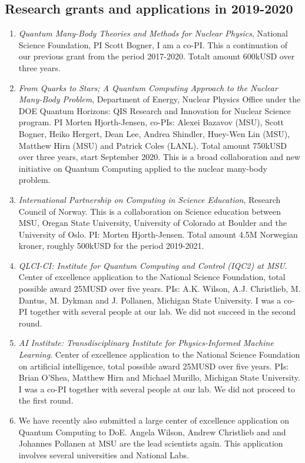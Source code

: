 \documentclass[prc,amsart,english,superscriptaddress,showpacs,floatfix]{revtex4}
\begin{document}
\subsection*{Research grants and applications in 2019-2020}
\begin{enumerate}
\item {\em Quantum Many-Body Theories and Methods for Nuclear Physics}, National Science Foundation, PI Scott Bogner, I am a co-PI. This a continuation of our previous grant from the period 2017-2020. Totalt amount 600kUSD over three years.
\item  {\em From Quarks to Stars; A Quantum Computing Approach to the Nuclear Many-Body Problem}, Department of Energy, Nuclear Physics Office under the DOE Quantum Horizons: QIS Research and Innovation for Nuclear Science program. PI Morten Hjorth-Jensen, co-PIs: Alexei Bazavov (MSU), Scott Bogner, Heiko Hergert, Dean Lee, Andrea Shindler, Huey-Wen Lin (MSU), Matthew Hirn (MSU) and Patrick Coles (LANL). Total amount 750kUSD over three years, start September 2020. This is a broad collaboration and new initiative on Quantum Computing applied to the nuclear many-body problem.
\item {\em International Partnership on Computing in Science Education}, Research Council of Norway. This is a collaboration on Science education between MSU, Oregan State University, University of Colorado at Boulder and the University of Oslo. PI: Morten Hjorth-Jensen. Total amount 4.5M Norwegian kroner, roughly 500kUSD for the period 2019-2021.
\item {\em QLCI-CI: Institute for Quantum Computing and Control (IQC2) at MSU}. Center of excellence application to the National Science Foundation, total possible award 25MUSD over five years. PIs: A.K. Wilson, A.J. Christlieb, M. Dantus, M. Dykman and J. Pollanen, Michigan State University. I was a co-PI together with several people at our lab. We did not succeed in the second round.
\item {\em AI Institute: Transdisciplinary Institute for Physics-Informed Machine Learning}. Center of excellence application to the National Science Foundation on artificial intelligence, total possible award 25MUSD over five years. PIs: Brian O'Shea, Matthew Hirn and Michael Murillo, Michigan State University. I was a co-PI together with several people at our lab. We did not proceed to the first round.  
\item We have recently also submitted a large center of excellence application on Quantum Computing to DoE. Angela Wilson, Andrew Christlieb and  and Johannes Pollanen at MSU are the lead scientists again. This application involves several universities and National Labs. 
\end{enumerate}
\end{document}
